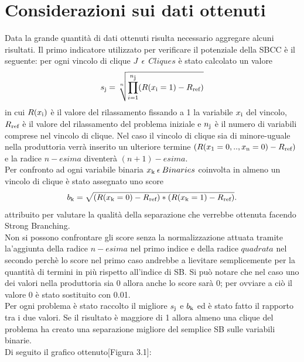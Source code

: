 \documentclass[12pt,a4paper,twoside,openright]{book}
\begin{document}
\section{Considerazioni sui dati ottenuti}
Data la grande quantità di dati ottenuti risulta necessario aggregare alcuni risultati. Il primo indicatore
utilizzato per verificare il potenziale della SBCC è il seguente: per ogni vincolo di clique 
$J\:\:\epsilon\:\:Cliques$ è stato calcolato un valore
\[ s\textsubscript{j} = \sqrt[n]{\prod_{i=1}^{n\textsubscript{j}} (R(x\textsubscript{i}=1)-R\textsubscript{ref}) }\] 
in cui $R(x\textsubscript{i})$ è il valore del rilassamento fissando a 1 la variabile $x\textsubscript{i}$
del vincolo, $R\textsubscript{ref}$ è il valore del rilassamento del problema iniziale e $n\textsubscript{j}$ è il 
numero di variabili comprese nel vincolo di clique. Nel caso il vincolo di clique sia di minore-uguale nella 
produttoria verrà inserito un ulteriore termine $(R(x\textsubscript{1}=0, .., x\textsubscript{n}=0)- R\textsubscript{ref})$ e la radice
$n-esima$ diventerà $(n+1)-esima$.\\
Per confronto ad ogni variabile binaria $x\textsubscript{k}\:\epsilon\:Binaries$ coinvolta in almeno un vincolo di clique è stato assegnato uno score
\[ b\textsubscript{k} = \sqrt{(R(x\textsubscript{k}=0)-R\textsubscript{ref})*(R(x\textsubscript{k}=1)-R\textsubscript{ref})}.\] attribuito per 
valutare la qualità della separazione che verrebbe ottenuta facendo Strong Branching.\\
Non si possono confrontare gli score senza la normalizzazione attuata tramite la'aggiunta della radice $n-esima$ nel primo indice
e della radice $quadrata$ nel secondo perchè lo score nel primo caso andrebbe a lievitare semplicemente per la quantità
di termini in più rispetto all'indice di SB.
Si può notare che nel caso uno dei valori nella produttoria sia 0 allora anche lo score sarà 0; per ovviare a ciò il 
valore 0 è stato sostituito con 0.01.\\
Per ogni problema è stato raccolto il migliore $s\textsubscript{j}$ e $b\textsubscript{k}$ ed è stato fatto il rapporto
tra i due valori. Se il risultato è maggiore di 1 allora almeno una clique del problema ha creato una separazione migliore del semplice SB
sulle variabili binarie.\\
Di seguito il grafico ottenuto[Figura 3.1]:
\end{document}
